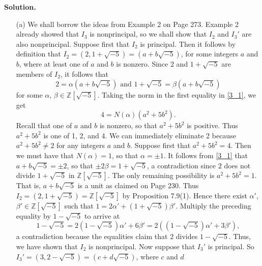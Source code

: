 \documentclass[9pt]{article}
\newcommand{\Z}{\mathbb{Z}}
\begin{document}
\begin{enumerate}
      \textbf{Solution.}

      \begin{enumerate}
         \item[(a)]
               We shall borrow the ideas from Example 2 on Page 273. Example 2
               already showed that $I_3$ is nonprincipal, so we shall show that
               $I_2$ and $I_3'$ are also nonprincipal. Suppose first that $I_2$
               is principal. Then it follows by definition that
               $I_2 = (2, 1 + \sqrt{-5}) = (a + b\sqrt{-5})$, for some integers 
               $a$ and $b$, where at least one of $a$ and $b$ is nonzero. Since 
               $2$ and $1 + \sqrt{-5}$ are members of $I_2$, it follows that
               \begin{equation} \label{3_1}
                  2 = \alpha(a + b\sqrt{-5}) \text{ and }
                  1 + \sqrt{-5} = \beta(a + b\sqrt{-5})
               \end{equation}
               for some $\alpha$, $\beta \in \Z[\sqrt{-5}]$. Taking the norm in
               the first equality in \eqref{3_1}, we get
               $$4 = N(\alpha)(a^2 + 5b^2).$$
               Recall that one of $a$ and $b$ is nonzero, so that $a^2 + 5b^2$
               is positive. Thus $a^2 + 5b^2$ is one of 1, 2, and 4. We can
               immediately eliminate 2 because $a^2 + 5b^2 \neq 2$ for any 
               integers $a$ and $b$. Suppose first that $a^2 + 5b^2 = 4$. Then 
               we must have that $N(\alpha) = 1$, so that $\alpha = \pm1$. It 
               follows from \eqref{3_1} that $a + b\sqrt{-5} = \pm2$, so that
               $\pm2\beta = 1 + \sqrt{-5}$, a contradiction since $2$ does
               not divide $1 + \sqrt{-5}$ in $\Z[\sqrt{-5}]$. The only remaining
               possibility is $a^2 + 5b^2 = 1$. That is, $a + b\sqrt{-5}$ is a
               unit as claimed on Page 230. Thus
               $I_2 = (2, 1 + \sqrt{-5}) = \Z[\sqrt{-5}]$ by Proposition 7.9(1).
               Hence there exist $\alpha'$, $\beta' \in \Z[\sqrt{-5}]$ such that
               $1 = 2\alpha' + (1 + \sqrt{-5})\beta'$. Multiply the
               preceding equality by $1 - \sqrt{-5}$ to arrive at
               $$1 - \sqrt{-5} = 2(1 - \sqrt{-5})\alpha' + 6\beta' =
                 2((1 - \sqrt{-5})\alpha' + 3\beta'),$$
               a contradiction because the equalities claim that 2 divides
               $1 - \sqrt{-5}$. Thus, we have shown that $I_2$ is nonprincipal.
               Now suppose that $I_3'$ is principal. So
               $I_3' = (3, 2 - \sqrt{-5}) = (c + d\sqrt{-5})$, where $c$ and $d$

\end{enumerate}
\end{enumerate}
\end{document}
